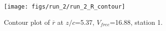 \begin{figure}[H]
\centering
\texttt{[image: figs/run\_2/run\_2\_R\_contour]}
\caption{Contour plot of $\overline{r}$ at $z/c$=5.37, $V_{free}$=16.88, station 1.}
\label{fig:run_2_R_contour}
\end{figure}


